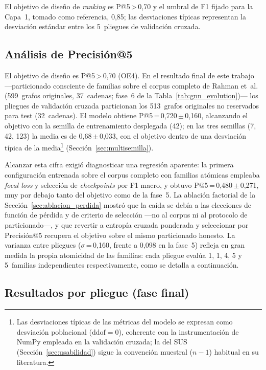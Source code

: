 El objetivo de diseño de \textit{ranking} es P@5\,>\,0,70 y el umbral
de F1 fijado para la Capa~1, tomado como referencia, 0,85; las desviaciones típicas
representan la desviación estándar entre los 5~pliegues de validación cruzada.

\subsection{Análisis de Precisión@5}

El objetivo de diseño es P@5\,>\,0,70 (OE4). En el resultado final de este trabajo
—particionado consciente de familias sobre el corpus completo de Rahman et~al.
(599~grafos originales, 37~cadenas; fase~6 de la Tabla~\ref{tab:gnn_evolution})—
los pliegues de validación cruzada particionan los 513~grafos originales no
reservados para test (32~cadenas). El modelo obtiene
P@5\,=\,0,720\,\(\pm\)\,0,160, alcanzando el objetivo con la semilla de
entrenamiento desplegada (42); en las tres semillas (7, 42, 123) la media es
de 0,68\,\(\pm\)\,0,033, con el objetivo dentro de una desviación típica de la
media\footnote{Las desviaciones típicas de las métricas del modelo
se expresan como desviación poblacional (\(\text{ddof}=0\)), coherente con la
instrumentación de NumPy empleada en la validación cruzada; la del \ac{SUS}
(Sección~\ref{sec:usabilidad}) sigue la convención muestral (\(n-1\)) habitual en su
literatura.} (Sección~\ref{sec:multisemilla}).

Alcanzar esta cifra exigió diagnosticar una regresión aparente: la primera
configuración entrenada sobre el corpus completo con familias atómicas empleaba
\textit{focal loss} y selección de \textit{checkpoints} por F1 macro, y obtuvo
P@5\,=\,0,480\,\(\pm\)\,0,271, muy por debajo tanto del objetivo como de la
fase~5. La ablación factorial de la Sección~\ref{sec:ablacion_perdida} mostró
que la caída se debía a las elecciones de función de pérdida y de criterio de
selección —no al corpus ni al protocolo de particionado\mbox{—,} y que revertir a
entropía cruzada ponderada y seleccionar por Precisión@5 recupera el objetivo
sobre el mismo particionado honesto. La varianza entre pliegues
(\(\sigma\)\,=\,0,160, frente a 0,098 en la fase~5) refleja en gran medida la
propia atomicidad de las familias: cada pliegue evalúa 1, 1, 4, 5 y
5~familias independientes respectivamente, como se detalla a continuación.

\subsection{Resultados por pliegue (fase final)}

